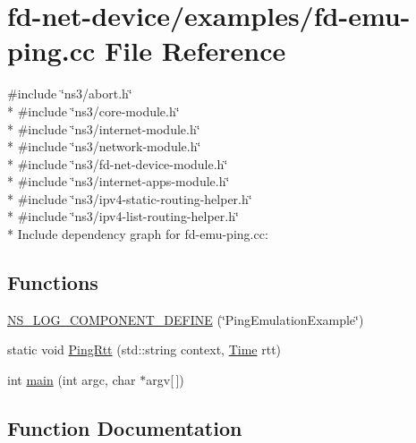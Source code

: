 \hypertarget{fd-emu-ping_8cc}{}\section{fd-\/net-\/device/examples/fd-\/emu-\/ping.cc File Reference}
\label{fd-emu-ping_8cc}
{\ttfamily \#include \char`\"{}ns3/abort.\+h\char`\"{}}\\*
{\ttfamily \#include \char`\"{}ns3/core-\/module.\+h\char`\"{}}\\*
{\ttfamily \#include \char`\"{}ns3/internet-\/module.\+h\char`\"{}}\\*
{\ttfamily \#include \char`\"{}ns3/network-\/module.\+h\char`\"{}}\\*
{\ttfamily \#include \char`\"{}ns3/fd-\/net-\/device-\/module.\+h\char`\"{}}\\*
{\ttfamily \#include \char`\"{}ns3/internet-\/apps-\/module.\+h\char`\"{}}\\*
{\ttfamily \#include \char`\"{}ns3/ipv4-\/static-\/routing-\/helper.\+h\char`\"{}}\\*
{\ttfamily \#include \char`\"{}ns3/ipv4-\/list-\/routing-\/helper.\+h\char`\"{}}\\*
Include dependency graph for fd-\/emu-\/ping.cc\+:
\subsection*{Functions}
\begin{DoxyCompactItemize}
\item 
\hyperlink{fd-emu-ping_8cc_a2b9eea29f4773033a7ecf1b30896dd19}{N\+S\+\_\+\+L\+O\+G\+\_\+\+C\+O\+M\+P\+O\+N\+E\+N\+T\+\_\+\+D\+E\+F\+I\+NE} (\char`\"{}Ping\+Emulation\+Example\char`\"{})
\item 
static void \hyperlink{fd-emu-ping_8cc_a1a49f760c7e3da367b3406515d2a3ef9}{Ping\+Rtt} (std\+::string context, \hyperlink{classns3_1_1Time}{Time} rtt)
\item 
int \hyperlink{fd-emu-ping_8cc_a0ddf1224851353fc92bfbff6f499fa97}{main} (int argc, char $\ast$argv\mbox{[}$\,$\mbox{]})
\end{DoxyCompactItemize}


\subsection{Function Documentation}
